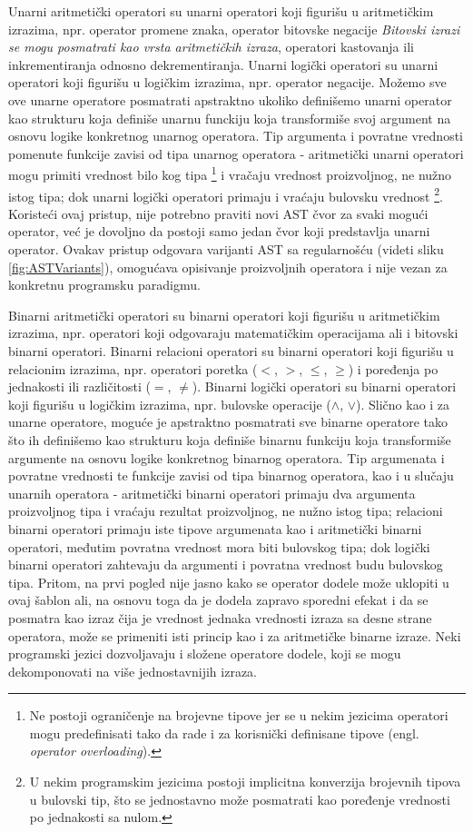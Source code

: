 Unarni aritmetički operatori su unarni operatori koji figurišu u aritmetičkim izrazima, npr. operator promene znaka, operator bitovske negacije \emph{Bitovski izrazi se mogu posmatrati kao vrsta aritmetičkih izraza}, operatori kastovanja ili inkrementiranja odnosno dekrementiranja. Unarni logički operatori su unarni operatori koji figurišu u logičkim izrazima, npr. operator negacije. Možemo sve ove unarne operatore posmatrati apstraktno ukoliko definišemo unarni operator kao strukturu koja definiše unarnu funckiju koja transformiše svoj argument na osnovu logike konkretnog unarnog operatora. Tip argumenta i povratne vrednosti pomenute funkcije zavisi od tipa unarnog operatora - aritmetički unarni operatori mogu primiti vrednost bilo kog tipa \footnote{Ne postoji ograničenje na brojevne tipove jer se u nekim jezicima operatori mogu predefinisati tako da rade i za korisnički definisane tipove (engl. \emph{operator overloading}).} i vračaju vrednost proizvoljnog, ne nužno istog tipa; dok unarni logički operatori primaju i vraćaju bulovsku vrednost \footnote{U nekim programskim jezicima postoji implicitna konverzija brojevnih tipova u bulovski tip, što se jednostavno može posmatrati kao poređenje vrednosti po jednakosti sa nulom.}. Koristeći ovaj pristup, nije potrebno praviti novi AST čvor za svaki mogući operator, već je dovoljno da postoji samo jedan čvor koji predstavlja unarni operator. Ovakav pristup odgovara varijanti AST sa regularnošću (videti sliku \ref{fig:ASTVariants}), omogućava opisivanje proizvoljnih operatora i nije vezan za konkretnu programsku paradigmu.

Binarni aritmetički operatori su binarni operatori koji figurišu u aritmetičkim izrazima, npr. operatori koji odgovaraju matematičkim operacijama ali i bitovski binarni operatori. Binarni relacioni operatori su binarni operatori koji figurišu u relacionim izrazima, npr. operatori poretka ($<$, $>$, $\leq$, $\geq$) i poređenja po jednakosti ili različitosti ($=$, $\neq$). Binarni logički operatori su binarni operatori koji figurišu u logičkim izrazima, npr. bulovske operacije ($\wedge$, $\vee$). Slično kao i za unarne operatore, moguće je apstraktno posmatrati sve binarne operatore tako što ih definišemo kao strukturu koja definiše binarnu funkciju koja transformiše argumente na osnovu logike konkretnog binarnog operatora. Tip argumenata i povratne vrednosti te funkcije zavisi od tipa binarnog operatora, kao i u slučaju unarnih operatora - aritmetički binarni operatori primaju dva argumenta proizvoljnog tipa i vraćaju rezultat proizvoljnog, ne nužno istog tipa; relacioni binarni operatori primaju iste tipove argumenata kao i aritmetički binarni operatori, međutim povratna vrednost mora biti bulovskog tipa; dok logički binarni operatori zahtevaju da argumenti i povratna vrednost budu bulovskog tipa. Pritom, na prvi pogled nije jasno kako se operator dodele može uklopiti u ovaj šablon ali, na osnovu toga da je dodela zapravo sporedni efekat i da se posmatra kao izraz čija je vrednost jednaka vrednosti izraza sa desne strane operatora, može se primeniti isti princip kao i za aritmetičke binarne izraze. Neki programski jezici dozvoljavaju i složene operatore dodele, koji se mogu dekomponovati na više jednostavnijih izraza.
